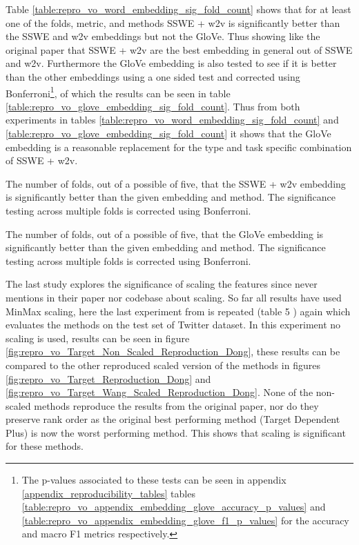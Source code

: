 Table \ref{table:repro_vo_word_embedding_sig_fold_count} shows that for at least one of the folds, metric, and methods SSWE + w2v is significantly better than the SSWE and w2v embeddings but not the GloVe. Thus showing like the original paper that SSWE + w2v are the best embedding in general out of SSWE and w2v. Furthermore the GloVe embedding is also tested to see if it is better than the other embeddings using a one sided test and corrected using Bonferroni\footnote{The p-values associated to these tests can be seen in appendix \ref{appendix_reproducibility_tables} tables \ref{table:repro_vo_appendix_embedding_glove_accuracy_p_values} and \ref{table:repro_vo_appendix_embedding_glove_f1_p_values} for the accuracy and macro F1 metrics respectively.}, of which the results can be seen in table \ref{table:repro_vo_glove_embedding_sig_fold_count}. Thus from both experiments in tables \ref{table:repro_vo_word_embedding_sig_fold_count} and \ref{table:repro_vo_glove_embedding_sig_fold_count} it shows that the GloVe embedding is a reasonable replacement for the type and task specific combination of SSWE + w2v.

\begin{table}[!h]
    \centering
    
    \caption{The number of folds, out of a possible of five, that the SSWE + w2v embedding is significantly better than the given embedding and method. The significance testing across multiple folds is corrected using Bonferroni.}
    \label{table:repro_vo_word_embedding_sig_fold_count}
\end{table}

\begin{table}[!h]
    \centering
    
    \caption{The number of folds, out of a possible of five, that the GloVe embedding is significantly better than the given embedding and method. The significance testing across multiple folds is corrected using Bonferroni.}
    \label{table:repro_vo_glove_embedding_sig_fold_count}
\end{table}

The last study explores the significance of scaling the features since \citet{vo2015target} never mentions in their paper nor codebase about scaling. So far all results have used MinMax scaling, here the last experiment from \citet{vo2015target} is repeated (table 5 \citep{vo2015target}) again which evaluates the methods on the test set of \citet{dong-etal-2014-adaptive} Twitter dataset. In this experiment no scaling is used, results can be seen in figure \ref{fig:repro_vo_Target_Non_Scaled_Reproduction_Dong}, these results can be compared to the other reproduced scaled version of the methods in figures \ref{fig:repro_vo_Target_Reproduction_Dong} and \ref{fig:repro_vo_Target_Wang_Scaled_Reproduction_Dong}. None of the non-scaled methods reproduce the results from the original paper, nor do they preserve rank order as the original best performing method (Target Dependent Plus) is now the worst performing method. This shows that scaling is significant for these methods.

